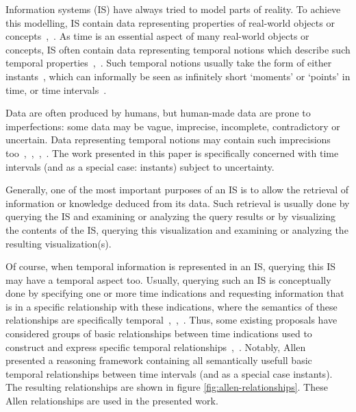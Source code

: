 Information systems (IS) have always tried to model parts of reality. To achieve this modelling, IS contain data representing properties of real-world objects or concepts~\cite{JoseEnriquePons2012},~\cite{Billiet2012}. As time is an essential aspect of many real-world objects or concepts, IS often contain data representing temporal notions which describe such temporal properties~\cite{Bolour1982},~\cite{VanderCruyssen1997}. Such temporal notions usually take the form of either instants~\cite{Jensen1998}, which can informally be seen as infinitely short `moments' or `points' in time, or time intervals~\cite{Jensen1998}.

Data are often produced by humans, but human-made data are prone to imperfections: some data may be vague, imprecise, incomplete, contradictory or uncertain. Data representing temporal notions may contain such imprecisions too~\cite{Devos1994},~\cite{Dubois2003},~\cite{JoseEnriquePons2012},~\cite{Billiet2012}. The work presented in this paper is specifically concerned with time intervals (and as a special case: instants) subject to uncertainty.

Generally, one of the most important purposes of an IS is to allow the retrieval of information or knowledge deduced from its data. Such retrieval is usually done by querying the IS and examining or analyzing the query results or by visualizing the contents of the IS, querying this visualization and examining or analyzing the resulting visualization(s).

Of course, when temporal information is represented in an IS, querying this IS may have a temporal aspect too. Usually, querying such an IS is conceptually done by specifying one or more time indications and requesting information that is in a specific relationship with these indications, where the semantics of these relationships are specifically temporal~\cite{Billiet2012},~\cite{JoseEnriquePons2012},~\cite{Pons2012a}. Thus, some existing proposals have considered groups of basic relationships between time indications used to construct and express specific temporal relationships~\cite{Medina1994},~\cite{Schockaert2008}. Notably, Allen~\cite{Allen1983} presented a reasoning framework containing all semantically usefull basic temporal relationships between time intervals (and as a special case instants). The resulting relationships are shown in figure \ref{fig:allen-relationships}. These Allen relationships are used in the presented work.

